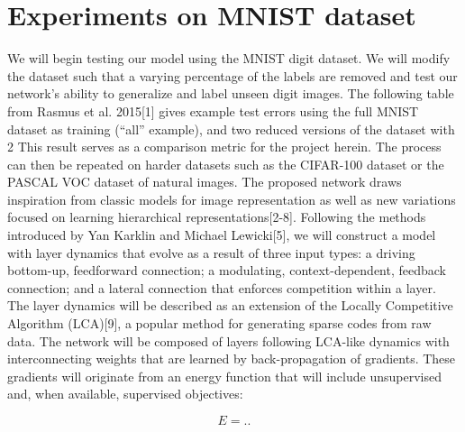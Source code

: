 \section{Experiments on MNIST dataset}
We will begin testing our model using the MNIST digit dataset. We will modify the dataset such that a varying percentage of the labels are removed and test our network’s ability to generalize and label unseen digit images. The following table from Rasmus et al. 2015[1] gives example test errors using the full MNIST dataset as training (“all” example), and two reduced versions of the dataset with 2%
This result serves as a comparison metric for the project herein. The process can then be repeated on harder datasets such as the CIFAR-100 dataset or the PASCAL VOC dataset of natural images. 
The proposed network draws inspiration from classic models for image representation as well as new variations focused on learning hierarchical representations[2-8]. Following the methods introduced by Yan Karklin and Michael Lewicki[5], we will construct a model with layer dynamics that evolve as a result of three input types: a driving bottom-up, feedforward connection; a modulating, context-dependent, feedback connection; and a lateral connection that enforces competition within a layer. The layer dynamics will be described as an extension of the Locally Competitive Algorithm (LCA)[9], a popular method for generating sparse codes from raw data. The network will be composed of layers following LCA-like dynamics with interconnecting weights that are learned by back-propagation of gradients. These gradients will originate from an energy function that will include unsupervised and, when available, supervised objectives:

\begin{equation}\label{weakly_sup_energy}
E = ..
\end{equation}

